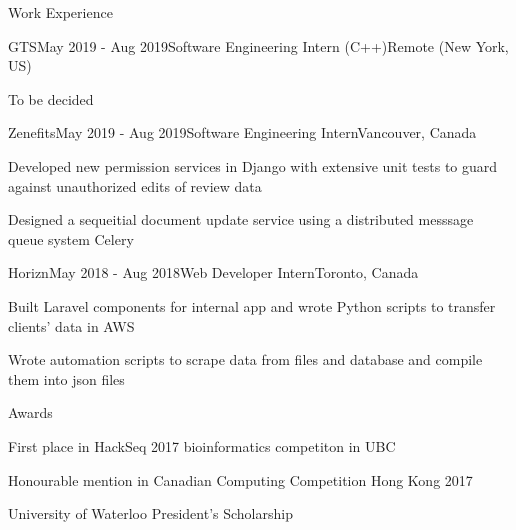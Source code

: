 \documentclass{cv}
\begin{document}
\begin{rSection}{Work Experience}
\begin{rSubsection}{GTS}{May 2019 - Aug 2019}{Software Engineering Intern (C++)}{Remote (New York, US)}
	\item To be decided
\end{rSubsection}

\begin{rSubsection}{Zenefits}{May 2019 - Aug 2019}{Software Engineering Intern}{Vancouver, Canada}
	\item Developed new permission services in Django with extensive unit tests to guard against unauthorized edits of review data
	\item Designed a sequeitial document update service using a distributed messsage queue system Celery
\end{rSubsection}

\begin{rSubsection}{Horizn}{May 2018 - Aug 2018}{Web Developer Intern}{Toronto, Canada}
	\item Built Laravel components for internal app and wrote Python scripts to transfer clients’ data in AWS
	\item Wrote automation scripts to scrape data from files and database and compile them into json files
\end{rSubsection}
\end{rSection}

\begin{rSection}{Awards}
\begin{rSubsectionPure}
	\item First place in HackSeq 2017 bioinformatics competiton in UBC
	\item Honourable mention in Canadian Computing Competition Hong Kong 2017
	\item University of Waterloo President's Scholarship
\end{rSubsectionPure}
\end{rSection}
\end{document}
